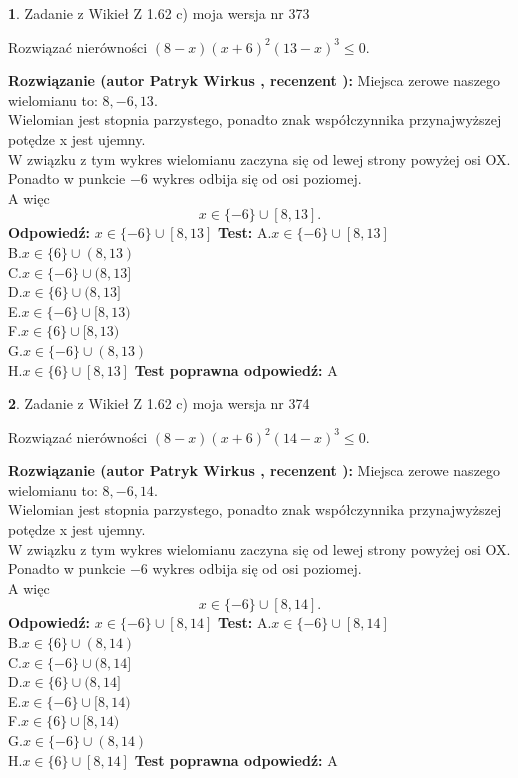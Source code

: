 \documentclass[12pt, a4paper]{article}
\theoremstyle{definition} %
\newtheorem{zad}{}
\newcommand{\zadStart}[1]{\begin{zad}#1\newline}
\newcommand{\zadStop}{\end{zad}}
\newcommand{\rozwStart}[2]{\noindent \textbf{Rozwiązanie (autor #1 , recenzent #2): }\newline}
\newcommand{\rozwStop}{\newline}
\newcommand{\odpStart}{\noindent \textbf{Odpowiedź:}\newline}
\newcommand{\odpStop}{\newline}
\newcommand{\testStart}{\noindent \textbf{Test:}\newline}
\newcommand{\testStop}{\newline}
\newcommand{\kluczStart}{\noindent \textbf{Test poprawna odpowiedź:}\newline}
\newcommand{\kluczStop}{\newline}
\begin{document}
\zadStart{Zadanie z Wikieł Z 1.62 c) moja wersja nr 373}

Rozwiązać nierówności $(8-x)(x+6)^{2}(13-x)^{3}\le0$.
\zadStop
\rozwStart{Patryk Wirkus}{}
Miejsca zerowe naszego wielomianu to: $8, -6, 13$.\\
Wielomian jest stopnia parzystego, ponadto znak współczynnika przy\linebreak najwyższej potędze x jest ujemny.\\ W związku z tym wykres wielomianu zaczyna się od lewej strony powyżej osi OX.\\
Ponadto w punkcie $-6$ wykres odbija się od osi poziomej.\\
A więc $$x \in \{-6\} \cup [8,13].$$
\rozwStop
\odpStart
$x \in \{-6\} \cup [8,13]$
\odpStop
\testStart
A.$x \in \{-6\} \cup [8,13]$\\
B.$x \in \{6\} \cup (8,13)$\\
C.$x \in \{-6\} \cup (8,13]$\\
D.$x \in \{6\} \cup (8,13]$\\
E.$x \in \{-6\} \cup [8,13)$\\
F.$x \in \{6\} \cup [8,13)$\\
G.$x \in \{-6\} \cup (8,13)$\\
H.$x \in \{6\} \cup [8,13]$
\testStop
\kluczStart
A
\kluczStop



\zadStart{Zadanie z Wikieł Z 1.62 c) moja wersja nr 374}

Rozwiązać nierówności $(8-x)(x+6)^{2}(14-x)^{3}\le0$.
\zadStop
\rozwStart{Patryk Wirkus}{}
Miejsca zerowe naszego wielomianu to: $8, -6, 14$.\\
Wielomian jest stopnia parzystego, ponadto znak współczynnika przy\linebreak najwyższej potędze x jest ujemny.\\ W związku z tym wykres wielomianu zaczyna się od lewej strony powyżej osi OX.\\
Ponadto w punkcie $-6$ wykres odbija się od osi poziomej.\\
A więc $$x \in \{-6\} \cup [8,14].$$
\rozwStop
\odpStart
$x \in \{-6\} \cup [8,14]$
\odpStop
\testStart
A.$x \in \{-6\} \cup [8,14]$\\
B.$x \in \{6\} \cup (8,14)$\\
C.$x \in \{-6\} \cup (8,14]$\\
D.$x \in \{6\} \cup (8,14]$\\
E.$x \in \{-6\} \cup [8,14)$\\
F.$x \in \{6\} \cup [8,14)$\\
G.$x \in \{-6\} \cup (8,14)$\\
H.$x \in \{6\} \cup [8,14]$
\testStop
\kluczStart
A
\kluczStop
\end{document}
